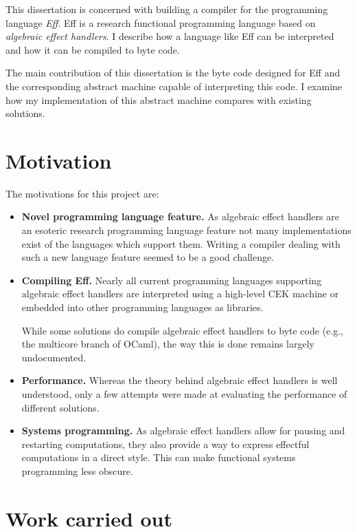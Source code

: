 \documentclass[class=article,crop=false,11pt]{standalone}
\begin{document}
This dissertation is concerned with building a compiler for the programming 
language \emph{Eff}. Eff is a research functional programming language based 
on \emph{algebraic effect handlers}. I describe how a language like Eff can 
be interpreted and how it can be compiled to byte code.

The main contribution of this dissertation is the byte code designed for Eff
and the corresponding abstract machine capable of interpreting this code. I 
examine how my implementation of this abstract machine compares with 
existing solutions.

\section{Motivation}

The motivations for this project are:
\begin{itemize}
\item \textbf{Novel programming language feature.} 
As algebraic effect handlers are an esoteric research programming language
feature not many implementations exist of the languages which support them.
Writing a compiler dealing with such a new language feature seemed to be a
good challenge.

\item \textbf{Compiling Eff.}
Nearly all current programming languages supporting algebraic effect handlers
are interpreted using a high-level CEK machine or embedded into other
programming languages as libraries.

While some solutions do compile algebraic effect handlers to byte code (e.g.,
the multicore branch of OCaml), the way this is done remains largely
undocumented.

\item \textbf{Performance.}
Whereas the theory behind algebraic effect handlers is well understood, only a
few attempts were made at evaluating the performance of different solutions.

\item \textbf{Systems programming.}
As algebraic effect handlers allow for pausing and restarting computations, they
also provide a way to express effectful computations in a direct style.
This can make functional systems programming less obscure.

\end{itemize}

\section{Work carried out}
\end{document}
